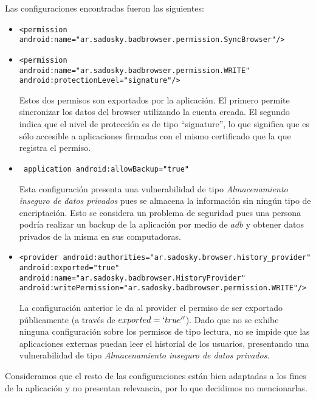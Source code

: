 \documentclass[10pt, a4paper]{article}
\begin{document}
Las configuraciones encontradas fueron las siguientes:
\begin{itemize}
\item \begin{verbatim}<permission android:name="ar.sadosky.badbrowser.permission.SyncBrowser"/> \end{verbatim} 
\item \begin{verbatim}<permission
android:name="ar.sadosky.badbrowser.permission.WRITE"
android:protectionLevel="signature"/> \end{verbatim}

Estos dos permisos son exportados por la aplicación. El primero permite sincronizar los datos del browser utilizando la cuenta creada. El segundo indica que el nivel de protección es de tipo ``signature'', lo que significa que es sólo accesible a aplicaciones firmadas con el mismo certificado que la que registra el permiso.

\item \begin{verbatim} application android:allowBackup="true" \end{verbatim}

Esta configuración presenta una vulnerabilidad de tipo \textit{Almacenamiento inseguro de datos privados} pues se almacena la información sin ningún tipo de encriptación. Esto se considera un problema de seguridad pues una persona podría realizar un backup de la aplicación por medio de $adb$ y obtener datos privados de la misma en sus computadoras.


\item \begin{verbatim}
<provider android:authorities="ar.sadosky.browser.history_provider"
android:exported="true"
android:name="ar.sadosky.badbrowser.HistoryProvider"
android:writePermission="ar.sadosky.badbrowser.permission.WRITE"/>
\end{verbatim}

La configuración anterior le da al provider el permiso de ser exportado públicamente (a través de $exported=`true''$). 
Dado que no se exhibe ninguna configuración sobre los permisos de tipo lectura, no se impide que las aplicaciones externas puedan leer el historial de los usuarios, presentando una vulnerabilidad de tipo \textit{Almacenamiento inseguro de datos privados}. 

\end{itemize}

Consideramos que el resto de las configuraciones están bien adaptadas a los fines de la aplicación y no presentan relevancia, por lo que decidimos no mencionarlas.
\end{document}
